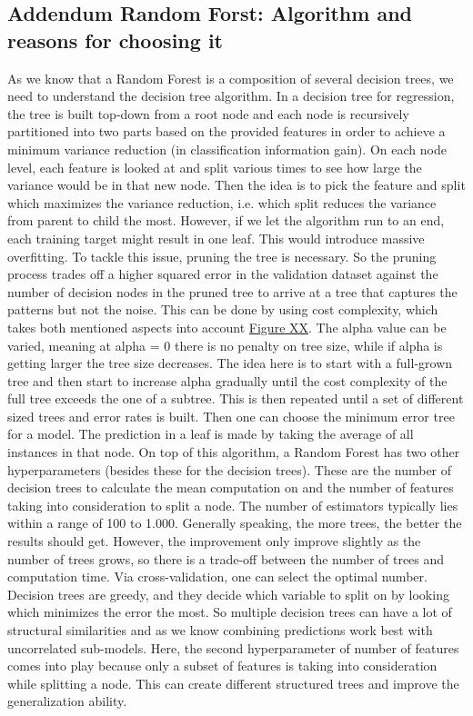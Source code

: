 \subsection*{Addendum Random Forst: Algorithm and reasons for choosing it}
\label{addendumRF}
As we know that a Random Forest is a composition of several decision trees, we need to understand the decision tree algorithm. In a decision tree for regression, the tree is built top-down from a root node and each node is recursively partitioned into two parts based on the provided features in order to achieve a minimum variance reduction (in classification information gain). On each node level, each feature is looked at and split various times to see how large the variance would be in that new node. Then the idea is to pick the feature and split which maximizes the variance reduction, i.e. which split reduces the variance from parent to child the most. However, if we let the algorithm run to an end, each training target might result in one leaf. This would introduce massive overfitting. To tackle this issue, pruning the tree is necessary. So the pruning process trades off a higher squared error in the validation dataset against the number of decision nodes in the pruned tree to arrive at a tree that captures the patterns but not the noise. This can be done by using cost complexity, which takes both mentioned aspects into account \hyperref[Fig_CC]{Figure XX}. The alpha value can be varied, meaning at alpha = 0 there is no penalty on tree size, while if alpha is getting larger the tree size decreases. The idea here is to start with a full-grown tree and then start to increase alpha gradually until the cost complexity of the full tree exceeds the one of a subtree. This is then repeated until a set of different sized trees and error rates is built. Then one can choose the minimum error tree for a model. The prediction in a leaf is made by taking the average of all instances in that node. On top of this algorithm, a Random Forest has two other hyperparameters (besides these for the decision trees). These are the number of decision trees to calculate the mean computation on and the number of features taking into consideration to split a node. The number of estimators typically lies within a range of 100 to 1.000. Generally speaking, the more trees, the better the results should get. However, the improvement only improve slightly as the number of trees grows, so there is a trade-off between the number of trees and computation time. Via cross-validation, one can select the optimal number. Decision trees are greedy, and they decide which variable to split on by looking which minimizes the error the most. So multiple decision trees can have a lot of structural similarities and as we know combining predictions work best with uncorrelated sub-models. Here, the second hyperparameter of number of features comes into play because only a subset of features is taking into consideration while splitting a node. This can create different structured trees and improve the generalization ability.
